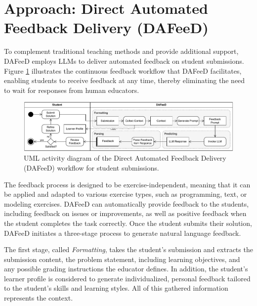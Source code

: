 \documentclass[sigconf,screen,review,anonymous]{acmart}
\begin{document}


\section{Approach: Direct Automated Feedback Delivery (DAFeeD)} %
\label{sec:approach:DAFeeD}

To complement traditional teaching methods and provide additional support, DAFeeD employs LLMs to deliver automated feedback on student submissions.
Figure \ref{fig:DAFeeD-workflow} illustrates the continuous feedback workflow that DAFeeD facilitates, enabling students to receive feedback at any time, thereby eliminating the need to wait for responses from human educators.

\begin{figure}[htbp]
  \centering
  \includegraphics[width=\linewidth]{figures/DAFeeD-ActivityDiagram_alternative.pdf}
  \caption{UML activity diagram of the Direct Automated Feedback Delivery (DAFeeD) workflow for student submissions.}
  \label{fig:DAFeeD-workflow}
  \vspace{-3mm}
\end{figure}

The feedback process is designed to be exercise-independent, meaning that it can be applied and adapted to various exercise types, such as programming, text, or modeling exercises.
DAFeeD can automatically provide feedback to the students, including feedback on issues or improvements, as well as positive feedback when the student completes the task correctly.
Once the student submits their solution, DAFeeD initiates a three-stage process to generate natural language feedback.

The first stage, called \textit{Formatting}, takes the student's submission and extracts the submission content, the problem statement, including learning objectives, and any possible grading instructions the educator defines.
In addition, the student's learner profile \cite{alexander:1998:ProfilingDifferencesStudents} is considered to generate individualized, personal feedback tailored to the student's skills and learning styles.
All of this gathered information represents the context.
\end{document}
